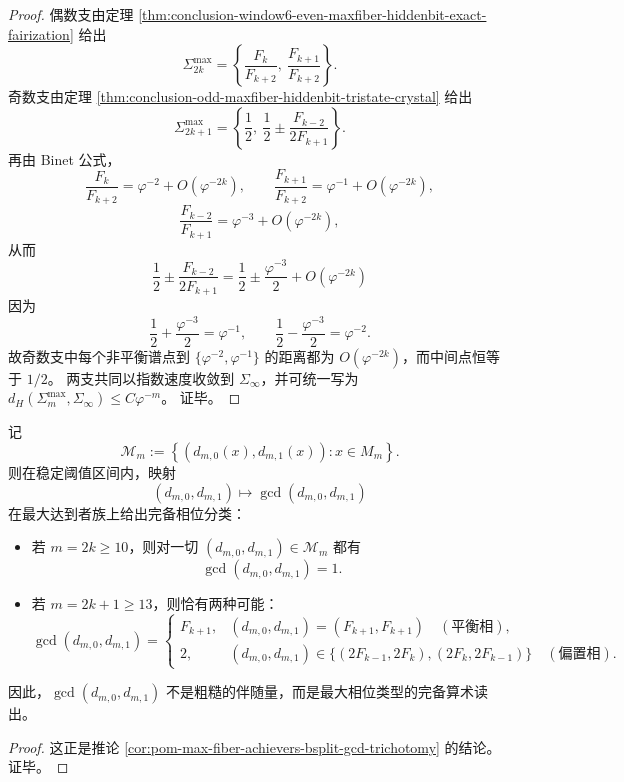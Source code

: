 \begin{proof}
偶数支由定理 \ref{thm:conclusion-window6-even-maxfiber-hiddenbit-exact-fairization} 给出
\[
\Sigma_{2k}^{\max}
=
\left\{
\frac{F_k}{F_{k+2}},\ \frac{F_{k+1}}{F_{k+2}}
\right\}.
\]
奇数支由定理 \ref{thm:conclusion-odd-maxfiber-hiddenbit-tristate-crystal} 给出
\[
\Sigma_{2k+1}^{\max}
=
\left\{
\frac12,\ \frac12\pm\frac{F_{k-2}}{2F_{k+1}}
\right\}.
\]
再由 Binet 公式，
\[
\frac{F_k}{F_{k+2}}=\varphi^{-2}+O(\varphi^{-2k}),
\qquad
\frac{F_{k+1}}{F_{k+2}}=\varphi^{-1}+O(\varphi^{-2k}),
\]
\[
\frac{F_{k-2}}{F_{k+1}}=\varphi^{-3}+O(\varphi^{-2k}),
\]
从而
\[
\frac12\pm\frac{F_{k-2}}{2F_{k+1}}
=
\frac12\pm\frac{\varphi^{-3}}2+O(\varphi^{-2k})
\]
因为
\[
\frac12+\frac{\varphi^{-3}}2=\varphi^{-1},
\qquad
\frac12-\frac{\varphi^{-3}}2=\varphi^{-2}.
\]
故奇数支中每个非平衡谱点到 \(\{\varphi^{-2},\varphi^{-1}\}\) 的距离都为 \(O(\varphi^{-2k})\)，而中间点恒等于 \(1/2\)。
两支共同以指数速度收敛到 \(\Sigma_\infty\)，并可统一写为
\(
d_H(\Sigma_m^{\max},\Sigma_\infty)\le C\varphi^{-m}
\)。
证毕。
\end{proof}

\begin{theorem}\label{thm:conclusion-maxfiber-hiddenbit-gcd-phase-classification}
记
\[
\mathcal M_m:=\left\{(d_{m,0}(x),d_{m,1}(x)):x\in M_m\right\}.
\]
则在稳定阈值区间内，映射
\[
(d_{m,0},d_{m,1})\longmapsto \gcd(d_{m,0},d_{m,1})
\]
在最大达到者族上给出完备相位分类：
\begin{itemize}
  \item 若 \(m=2k\ge 10\)，则对一切 \((d_{m,0},d_{m,1})\in\mathcal M_m\) 都有
  \[
  \gcd(d_{m,0},d_{m,1})=1.
  \]
  \item 若 \(m=2k+1\ge 13\)，则恰有两种可能：
  \[
  \gcd(d_{m,0},d_{m,1})=
  \begin{cases}
  F_{k+1},& (d_{m,0},d_{m,1})=(F_{k+1},F_{k+1})\quad(\text{平衡相}),\\[1ex]
  2,& (d_{m,0},d_{m,1})\in\{(2F_{k-1},2F_k),(2F_k,2F_{k-1})\}\quad(\text{偏置相}).
  \end{cases}
  \]
\end{itemize}
因此，\(\gcd(d_{m,0},d_{m,1})\) 不是粗糙的伴随量，而是最大相位类型的完备算术读出。
\end{theorem}

\begin{proof}
这正是推论 \ref{cor:pom-max-fiber-achievers-bsplit-gcd-trichotomy} 的结论。证毕。
\end{proof}

